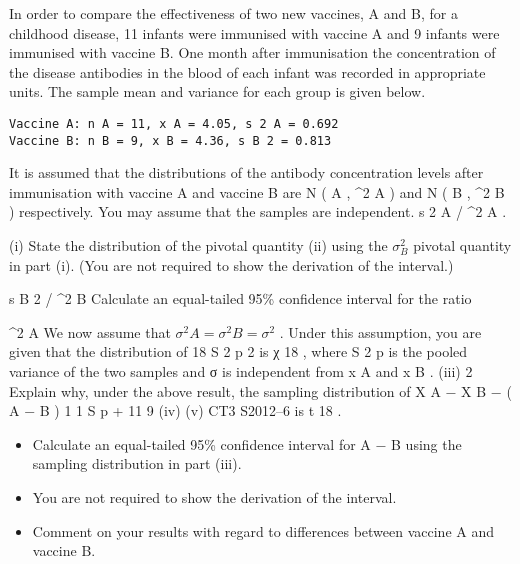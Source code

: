 \documentclass[a4paper,12pt]{article}
\begin{document}
In order to compare the effectiveness of two new vaccines, A and B, for a childhood
disease, 11 infants were immunised with vaccine A and 9 infants were immunised
with vaccine B. One month after immunisation the concentration of the disease
antibodies in the blood of each infant was recorded in appropriate units. The sample
mean and variance for each group is given below.
\begin{verbatim}
Vaccine A: n A = 11, x A = 4.05, s 2 A = 0.692
Vaccine B: n B = 9, x B = 4.36, s B 2 = 0.813
\end{verbatim}
It is assumed that the distributions of the antibody concentration levels after
immunisation with vaccine A and vaccine B are N ( \mu A , \sigma^2 A ) and N ( \mu B , \sigma^2 B )
respectively. You may assume that the samples are independent.
s 2 A / \sigma^2 A
.

(i) State the distribution of the pivotal quantity
(ii) using the
$\sigma^2_B$
pivotal quantity in part (i). (You are not required to show the derivation of the
interval.)

s B 2 / \sigma^2 B
Calculate an equal-tailed 95\% confidence interval for the ratio

\sigma^2 A
We now assume that $\sigma^2 A = \sigma^2 B = \sigma^2$ . Under this assumption, you are given that the
distribution of
18 S 2 p
2
is χ 18
, where S 2 p is the pooled variance of the two samples and
σ
is independent from x A and x B .
(iii)
2
Explain why, under the above result, the sampling distribution of
X A − X B − ( \mu A − \mu B )
1 1
S p
+
11 9
(iv)
(v)
CT3 S2012–6
is t 18 . 
\begin{itemize}
\item Calculate an equal-tailed 95\% confidence interval for \mu A − \mu B using the
sampling distribution in part (iii). 
\item You are not required to show the
derivation of the interval.
\item 
Comment on your results with regard to differences between vaccine A and
vaccine B.
\end{itemize}
\end{document}
